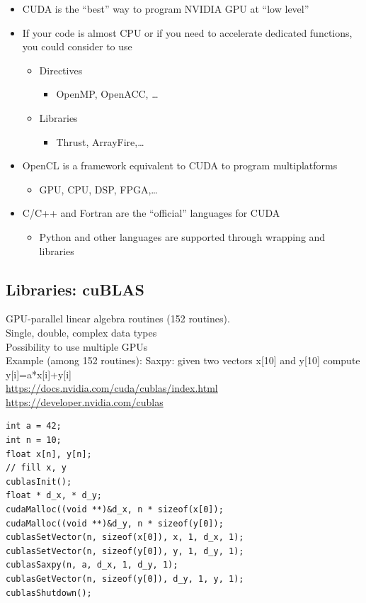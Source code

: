 \begin{itemize}
	\item CUDA is the “best” way to program NVIDIA GPU at “low level”
	\item If your code is almost CPU or if you need to accelerate dedicated functions, you could consider to use
	\begin{itemize}
		\item Directives
			\begin{itemize}
			\item OpenMP, OpenACC, …
			\end{itemize}
	\end{itemize}
		\begin{itemize}
		\item Libraries
			\begin{itemize}
			\item Thrust, ArrayFire,…
			\end{itemize}
		\end{itemize}
	\item OpenCL is a framework equivalent to CUDA to program multiplatforms
	\begin{itemize}
		\item GPU, CPU, DSP, FPGA,… 
	\end{itemize}
	\item C/C++ and Fortran are the “official” languages for CUDA
		\begin{itemize}
		\item Python and other languages are supported through	wrapping and libraries
		\end{itemize}
	\end{itemize}

\subsection{Libraries: cuBLAS}

GPU-parallel linear algebra routines (152 routines).\\
Single, double, complex data types\\
Possibility to use multiple GPUs\\
Example (among 152 routines): Saxpy: given two vectors x[10] and y[10] compute y[i]=a*x[i]+y[i]\\
\url{https://docs.nvidia.com/cuda/cublas/index.html}\\
\url{https://developer.nvidia.com/cublas}\\

\begin{verbatim}
int a = 42;
int n = 10;
float x[n], y[n];
// fill x, y
cublasInit();
float * d_x, * d_y;
cudaMalloc((void **)&d_x, n * sizeof(x[0]);
cudaMalloc((void **)&d_y, n * sizeof(y[0]);
cublasSetVector(n, sizeof(x[0]), x, 1, d_x, 1);
cublasSetVector(n, sizeof(y[0]), y, 1, d_y, 1);
cublasSaxpy(n, a, d_x, 1, d_y, 1);
cublasGetVector(n, sizeof(y[0]), d_y, 1, y, 1);
cublasShutdown();
\end{verbatim}


